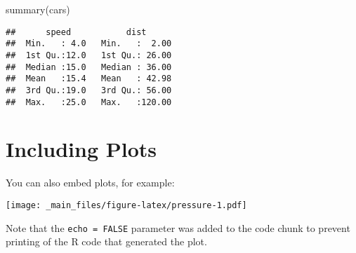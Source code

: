 \documentclass[
]{book}
\newenvironment{Shaded}{\begin{snugshade}}{\end{snugshade}}
\newcommand{\FunctionTok}[1]{\textcolor[rgb]{0.00,0.00,0.00}{#1}}
\newcommand{\NormalTok}[1]{#1}
\begin{document}
\begin{Shaded}
\begin{Highlighting}[]
\FunctionTok{summary}\NormalTok{(cars)}
\end{Highlighting}
\end{Shaded}

\begin{verbatim}
##      speed           dist       
##  Min.   : 4.0   Min.   :  2.00  
##  1st Qu.:12.0   1st Qu.: 26.00  
##  Median :15.0   Median : 36.00  
##  Mean   :15.4   Mean   : 42.98  
##  3rd Qu.:19.0   3rd Qu.: 56.00  
##  Max.   :25.0   Max.   :120.00
\end{verbatim}

\hypertarget{including-plots}{%
\section{Including Plots}\label{including-plots}}

You can also embed plots, for example:

\texttt{[image: \_main\_files/figure-latex/pressure-1.pdf]}

Note that the \texttt{echo\ =\ FALSE} parameter was added to the code chunk to prevent printing of the R code that generated the plot.

  
\end{document}

